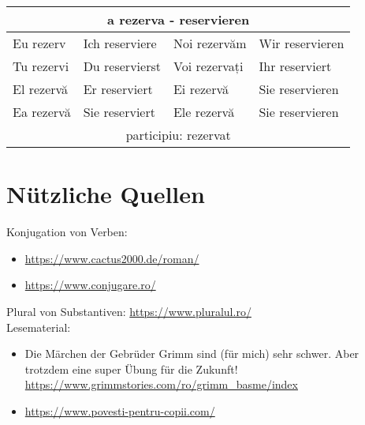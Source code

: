 \documentclass[11pt, oneside]{article}
\begin{document}
%
\begin{center}
  \begin{tabular}{ |p{3.25cm}|p{3.25cm}||p{3.25cm}|p{3.25cm}| }
      \hline
      \multicolumn{4}{|c|}{a rezerva - reservieren} \\
      \hline
      \hline
      Eu rezerv & Ich reserviere & Noi rezervăm & Wir reservieren\\
      \hline
      Tu rezervi & Du reservierst & Voi rezervați & Ihr reserviert\\
      \hline
      El rezervă & Er reserviert & Ei rezervă & Sie reservieren\\ 
      Ea rezervă & Sie reserviert & Ele rezervă & Sie reservieren\\
      \hline
      \multicolumn{4}{|c|}{participiu: rezervat} \\
      \hline
     \end{tabular}
\end{center}
%
%
%
%
\section{Nützliche Quellen}
Konjugation von Verben: 
\begin{itemize}
    \item \url{https://www.cactus2000.de/roman/}\\
    \item \url{https://www.conjugare.ro/}\\
\end{itemize}
Plural von Substantiven: \url{https://www.pluralul.ro/}\\
\newline
Lesematerial:
\begin{itemize}
  \item Die Märchen der Gebrüder Grimm sind (für mich) sehr schwer. Aber trotzdem eine super Übung für die Zukunft! \url{https://www.grimmstories.com/ro/grimm_basme/index}
  \item \url{https://www.povesti-pentru-copii.com/} 
\end{itemize}

%
\newpage
\printindex
%
\end{document}
